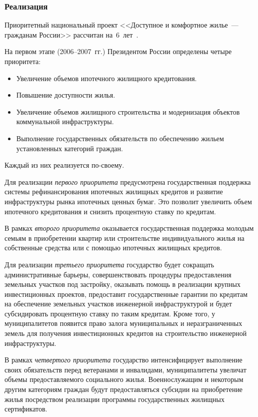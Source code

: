 \documentclass[article, 12pt, russian, oneside]{ncc}
\begin{document}
\subsubsection{Реализация}

Приоритетный национальный проект <<Доступное и комфортное жилье~---
гражданам России>> рассчитан на~6~лет~\cite{Hub_Goals}.

На первом этапе (2006--2007~гг.) Президентом России определены четыре
приоритета:

\begin{itemize}
\item Увеличение объемов ипотечного жилищного кредитования.
\item Повышение доступности жилья.
\item Увеличение объемов жилищного строительства и модернизация
  объектов коммунальной инфраструктуры.
\item Выполнение государственных обязательств по обеспечению жильем
  установленных категорий граждан.
\end{itemize}

Каждый из них реализуется по-своему.

Для реализации \emph{первого приоритета} предусмотрена государственная
поддержка системы рефинансирования ипотечных жилищных кредитов и
развитие инфраструктуры рынка ипотечных ценных бумаг. Это позволит
увеличить объем ипотечного кредитования и снизить процентную ставку по
кредитам.

В рамках \emph{второго приоритета} оказывается государственная
поддержка молодым семьям в приобретении квартир или строительстве
индивидуального жилья на собственные средства или с помощью ипотечных
жилищных кредитов.

Для реализации \emph{третьего приоритета} государство будет сокращать
административные барьеры, совершенствовать процедуры предоставления
земельных участков под застройку, оказывать помощь в реализации
крупных инвестиционных проектов, предоставит государственные гарантии
по кредитам на обеспечение земельных участков инженерной
инфраструктурой и будет субсидировать процентную ставку по таким
кредитам. Кроме того, у муниципалитетов появится право залога
муниципальных и неразграниченных земель для получения инвестиционных
кредитов на строительство инженерной инфраструктуры.

В рамках \emph{четвертого приоритета} государство интенсифицирует
выполнение своих обязательств перед ветеранами и инвалидами,
муниципалитеты увеличат объемы предоставляемого социального
жилья. Военнослужащим и некоторым другим категориям граждан будут
предоставляться субсидии на приобретение жилья посредством реализации
программы государственных жилищных сертификатов.
\end{document}
